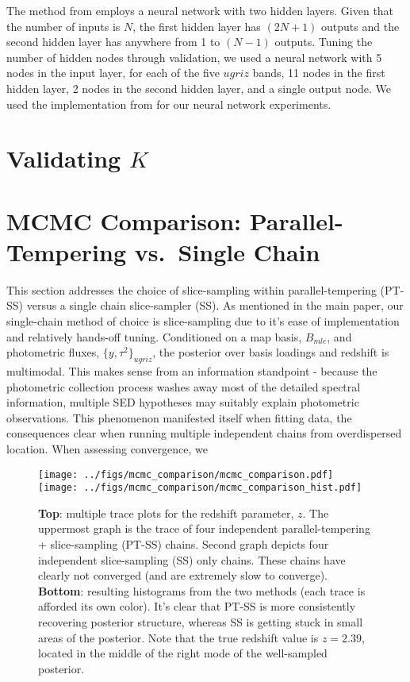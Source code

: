 \documentclass{article} %
\begin{document}
The method from \cite{brescia2013photometric} employs a neural network with two hidden layers. Given that the number of inputs is $N$, the first hidden layer has $(2N + 1)$ outputs and the second hidden layer has anywhere from 1 to $(N - 1)$ outputs. Tuning the number of hidden nodes through validation, we used a neural network with 5 nodes in the input layer, for each of the five $ugriz$ bands, 11 nodes in the first hidden layer, 2 nodes in the second hidden layer, and a single output node.  We used the implementation from \cite{pybrain2010jmlr} for our neural network experiments.  


\section{Validating $K$}



\section{MCMC Comparison: Parallel-Tempering vs.~Single Chain}
This section addresses the choice of slice-sampling within parallel-tempering (PT-SS) versus a single chain slice-sampler (SS).  As mentioned in the main paper, our single-chain method of choice is slice-sampling due to it's ease of implementation and relatively hands-off tuning. 
Conditioned on a map basis, $B_{mle}$, and photometric fluxes, $\{y, \tau^2\}_{ugriz}$, the posterior over basis loadings and redshift is multimodal.  This makes sense from an information standpoint - because the photometric collection process washes away most of the detailed spectral information, multiple SED hypotheses may suitably explain photometric observations. 
This phenomenon manifested itself when fitting data, the consequences clear when running multiple independent chains from overdispersed location.  
When assessing convergence, we 

\begin{figure}
\texttt{[image: ../figs/mcmc\_comparison/mcmc\_comparison.pdf]}
\texttt{[image: ../figs/mcmc\_comparison/mcmc\_comparison\_hist.pdf]}
\caption{\textbf{Top}: multiple trace plots for the redshift parameter, $z$.  The uppermost graph is the trace of four independent parallel-tempering + slice-sampling (PT-SS) chains.  Second graph depicts four independent slice-sampling (SS) only chains.  These chains have clearly not converged (and are extremely slow to converge). \textbf{Bottom}: resulting histograms from the two methods (each trace is afforded its own color).  It's clear that PT-SS is more consistently recovering posterior structure, whereas SS is getting stuck in small areas of the posterior. Note that the true redshift value is $z=2.39$, located in the middle of the right mode of the well-sampled posterior. }
\end{figure}
\end{document}
